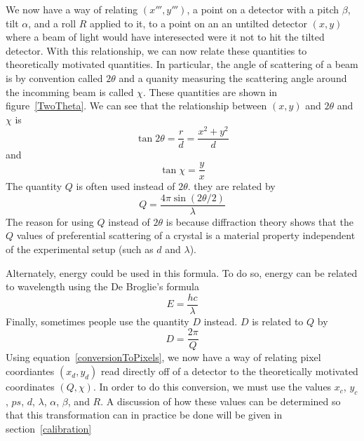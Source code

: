 \begin{SCfigure}[1][htb]
\centering

\caption{For a particular point $(x,y)$, we
alwasy associate two quantities: $2\theta$ and $\chi$.
$2\theta$ is the angle of scattering 
of the beam, or the angle that an incomming beam is 
difflected by when it diffracts off the crystal. 
$\chi$ is a measure of the azimuthal angle around 
the beam. It tells you in what direction radially 
outwards (with respect to the undeflected beam) 
the outgoing beam was was scattered.}
\label{TwoTheta}
\end{SCfigure}

We now have a way of relating $(x''',y''')$, 
a point on a detector with a pitch $\beta$, 
tilt $\alpha$, and a roll $R$ applied to it, 
to a point on an an untilted detector $(x,y)$
where a beam of light would have interesected
were it not to hit the tilted detector.
With this relationship, we can now relate
these quantities to theoretically motivated 
quantities. In particular, the angle of scattering 
of a beam is by convention called $2\theta$ and a 
quanity measuring the scattering angle around the 
incomming beam is called $\chi$. These quantities 
are shown in figure~\ref{TwoTheta}. We can see that 
the relationship between $(x,y)$ and $2\theta$ and 
$\chi$ is
\begin{equation}
    \tan2\theta = \frac{r}{d} = \frac{x^2+y^2}{d}
\end{equation}
and
\begin{equation}
    \tan\chi = \frac{y}{x}
\end{equation}
The quantity $Q$ is often used instead of $2\theta$. 
they are related by
\begin{equation}
    Q = \frac{4\pi \sin(2\theta/2)}{\lambda}
\end{equation}
The reason for using $Q$ instead of $2\theta$ is because 
diffraction theory shows that the $Q$ values of preferential 
scattering of a crystal is a material property independent 
of the experimental setup (such as $d$ and $\lambda$). 

Alternately, energy could be used in this formula.
To do so, energy can be related to wavelength using
the De Broglie's formula
\begin{equation}
E = \frac{hc}{\lambda}
\end{equation}
Finally, sometimes people use the quantity $D$ instead.
$D$ is related to $Q$ by
\begin{equation}
    D = \frac{2\pi}{Q}
\end{equation}
Using equation~\ref{conversionToPixels},
we now have a way of relating pixel
coordiantes $(x_d,y_d)$ read directly off
of a detector to the
theoretically motivated coordinates $(Q,\chi)$.
In order to do this conversion, we must use
the values $x_c$, $y_c$, $ps$, $d$, $\lambda$,
$\alpha$, $\beta$, and $R$. A discussion of
how these values can be determined so that
this transformation can in practice be done
will be given in section~\ref{calibration}


